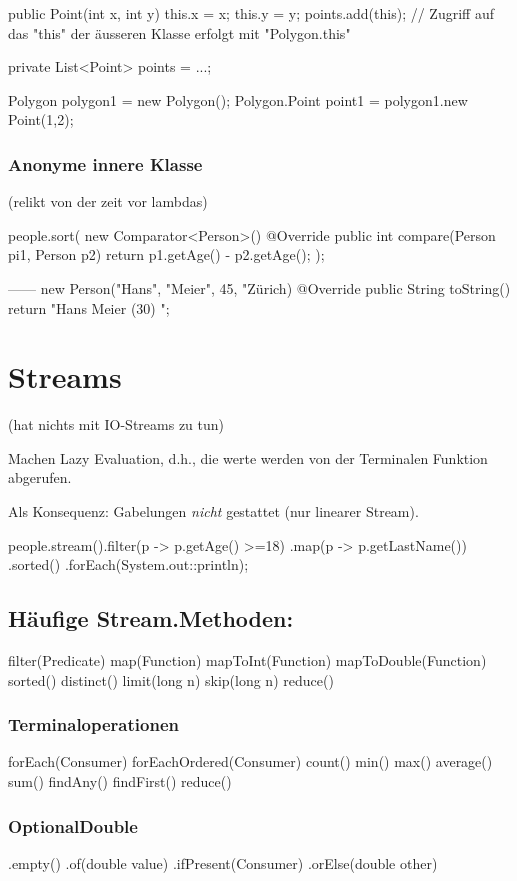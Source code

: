 {{{			public Point(int x, int y) {
				this.x = x; this.y = y;
				points.add(this); // Zugriff auf das "this" der äusseren Klasse erfolgt mit "Polygon.this"
			}
		}
		
		private List<Point> points = ...;
	}
	
	
	
	
	Polygon polygon1 = new Polygon();
	Polygon.Point point1 = polygon1.new Point(1,2);
	
\subsubsection{Anonyme innere Klasse}
 (relikt von der zeit vor lambdas)

	people.sort(
		new Comparator<Person>() {
			@Override
			public int compare(Person pi1, Person p2) {
				return p1.getAge() - p2.getAge();
			}
		}
	);
	
	------
	new Person("Hans", "Meier", 45, "Zürich) {
		@Override
		public String toString() {
			return "Hans Meier (30) ";
		}
	}
	
\section{Streams}

	(hat nichts mit IO-Streams zu tun)
	
	Machen Lazy Evaluation, d.h., die werte werden von der Terminalen Funktion abgerufen.
	
	Als Konsequenz: Gabelungen \emph{nicht} gestattet (nur linearer Stream).

	people.stream().filter(p -> p.getAge() >=18)
		.map(p -> p.getLastName())
		.sorted()
		.forEach(System.out::println);
		
		\subsection{Häufige Stream.Methoden:}
		filter(Predicate)
		map(Function)
		mapToInt(Function)
		mapToDouble(Function)
		sorted()
		distinct()
		limit(long n)
		skip(long n)
		reduce()
		
		\subsubsection{Terminaloperationen}
		forEach(Consumer)
		forEachOrdered(Consumer)
		count()
		min()
		max()
		average()
		sum()
		findAny()
		findFirst()
		reduce()
		
		
		\subsubsection{OptionalDouble}
		.empty()
		.of(double value)
		.ifPresent(Consumer)
		.orElse(double other)
		
}
